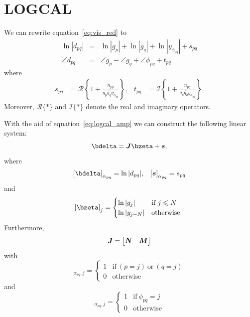 \documentclass[useAMS,usenatbib]{mn2e}
\newcommand{\bs}{\bmath{s}}
\newcommand{\bJ}{\bmath{J}}
\newcommand{\bN}{\bmath{N}}
\newcommand{\bM}{\bmath{M}}
\newcommand{\conj}[1]{\overline{#1}}
\begin{document}
\appendix



\section{\textsc{LOGCAL}}
\label{sec:logcal}
We can rewrite equation~\ref{eq:vis_red} to \citep{Liu2010}
\begin{eqnarray}
\ln |d_{pq}| &=& \ln |g_p| + \ln |g_q| + \ln |y_{\phi_{pq}}| + s_{pq} \label{eq:logcal_amp}\\
\angle d_{pq} &=& \angle g_p - \angle g_q + \angle \phi_{pq} + t_{pq} \label{eq:logcal_phase}
\end{eqnarray}
where
\begin{align}
s_{pq} &= \mathscr{R} \left \{1 + \frac{n_{pq}}{g_p\conj{g_q}y_{\phi_{pq}}} \right \}, & t_{pq} &= \mathscr{I}\left \{1 + \frac{n_{pq}}{g_p\conj{g_q}y_{\phi_{pq}}} \right \}.
\end{align}
Moreover, $\mathscr{R}\{*\}$ and $\mathscr{I}\{*\}$ denote the real and imaginary operators. 

With the aid of equation~\ref{eq:logcal_amp} we can construct the following linear system:
\begin{equation}
\label{eq:log_system}
\bdelta = \bJ\bzeta + \bs, 
\end{equation}
where
\begin{align}
\left [ \bdelta \right ]_{\alpha_{pq}} &= \ln |d_{pq}|, & \left [ \bs \right ]_{\alpha_{pq}} = s_{pq} 
\end{align}
and
\begin{equation}
\left [ \bzeta \right ]_{j} = \begin{cases} \ln |g_j| & \textrm{if}~j\leq N \\ \ln |y_{j-N}| & \textrm{otherwise} \end{cases}. 
\end{equation}
Furthermore,
\begin{equation}
\bJ = 
\begin{bmatrix}
\bN & \bM
\end{bmatrix}
\end{equation}
with 
\begin{equation}
[\bN]_{\alpha_{pq},j} = \begin{cases}
       1 & \textrm{if}~(p=j)~\textrm{or}~(q=j)\\
       0 & \textrm{otherwise}
      \end{cases}
\end{equation}
and
\begin{equation}
[\bM]_{\alpha_{pq},j} = \begin{cases}
       1 & \textrm{if}~\phi_{pq}=j\\
       0 & \textrm{otherwise}
      \end{cases}
\end{equation}
\end{document}
